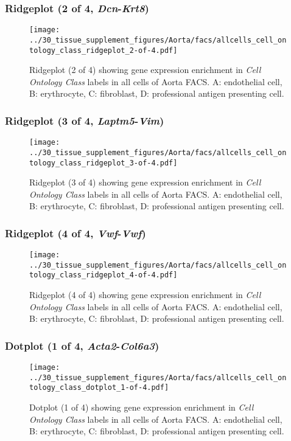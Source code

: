 \clearpage

\subsubsection{Ridgeplot (2 of 4, \emph{Dcn}-\emph{Krt8})}
\begin{figure}[h]
\centering
\texttt{[image: ../30\_tissue\_supplement\_figures/Aorta/facs/allcells\_cell\_ontology\_class\_ridgeplot\_2-of-4.pdf]}

\caption{ Ridgeplot (2 of 4)  showing gene expression enrichment in \emph{Cell Ontology Class} labels in all cells of Aorta FACS. A: endothelial cell, B: erythrocyte, C: fibroblast, D: professional antigen presenting cell.}
\end{figure}


\clearpage

\subsubsection{Ridgeplot (3 of 4, \emph{Laptm5}-\emph{Vim})}
\begin{figure}[h]
\centering
\texttt{[image: ../30\_tissue\_supplement\_figures/Aorta/facs/allcells\_cell\_ontology\_class\_ridgeplot\_3-of-4.pdf]}

\caption{ Ridgeplot (3 of 4)  showing gene expression enrichment in \emph{Cell Ontology Class} labels in all cells of Aorta FACS. A: endothelial cell, B: erythrocyte, C: fibroblast, D: professional antigen presenting cell.}
\end{figure}


\clearpage

\subsubsection{Ridgeplot (4 of 4, \emph{Vwf}-\emph{Vwf})}
\begin{figure}[h]
\centering
\texttt{[image: ../30\_tissue\_supplement\_figures/Aorta/facs/allcells\_cell\_ontology\_class\_ridgeplot\_4-of-4.pdf]}

\caption{ Ridgeplot (4 of 4)  showing gene expression enrichment in \emph{Cell Ontology Class} labels in all cells of Aorta FACS. A: endothelial cell, B: erythrocyte, C: fibroblast, D: professional antigen presenting cell.}
\end{figure}


\clearpage

\subsubsection{Dotplot (1 of 4, \emph{Acta2}-\emph{Col6a3})}
\begin{figure}[h]
\centering
\texttt{[image: ../30\_tissue\_supplement\_figures/Aorta/facs/allcells\_cell\_ontology\_class\_dotplot\_1-of-4.pdf]}

\caption{ Dotplot (1 of 4)  showing gene expression enrichment in \emph{Cell Ontology Class} labels in all cells of Aorta FACS. A: endothelial cell, B: erythrocyte, C: fibroblast, D: professional antigen presenting cell.}
\end{figure}


